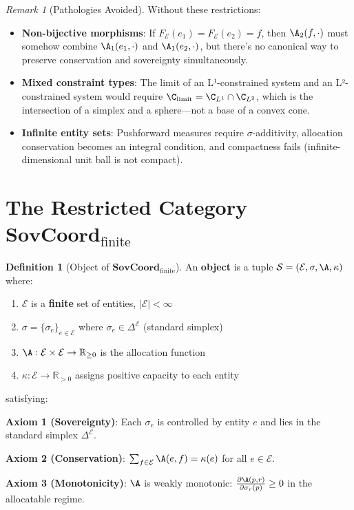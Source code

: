 \documentclass[11pt,a4paper]{article}
\theoremstyle{definition}
\newtheorem{definition}[theorem]{Definition}
\theoremstyle{remark}
\newtheorem{remark}[theorem]{Remark}
\newcommand{\E}{\mathcal{E}}
\newcommand{\SovCoord}{\mathbf{SovCoord}}
\begin{document}
\begin{remark}[Pathologies Avoided]
Without these restrictions:
\begin{itemize}
\item \textbf{Non-bijective morphisms}: If $F_\E(e_1) = F_\E(e_2) = f$, then $\A_2(f, \cdot)$ must somehow combine $\A_1(e_1, \cdot)$ and $\A_1(e_2, \cdot)$, but there's no canonical way to preserve conservation and sovereignty simultaneously.

\item \textbf{Mixed constraint types}: The limit of an L¹-constrained system and an L²-constrained system would require $\C_{\text{limit}} = \C_{L^1} \cap \C_{L^2}$, which is the intersection of a simplex and a sphere—not a base of a convex cone.

\item \textbf{Infinite entity sets}: Pushforward measures require $\sigma$-additivity, allocation conservation becomes an integral condition, and compactness fails (infinite-dimensional unit ball is not compact).
\end{itemize}
\end{remark}

\section{The Restricted Category $\SovCoord_{\text{finite}}$}

\begin{definition}[Object of $\SovCoord_{\text{finite}}$]
An \textbf{object} is a tuple $\mathcal{S} = (\E, \sigma, \A, \kappa)$ where:
\begin{enumerate}
\item $\E$ is a \textbf{finite} set of entities, $|\E| < \infty$
\item $\sigma = \{\sigma_e\}_{e \in \E}$ where $\sigma_e \in \Delta^{\E}$ (standard simplex)
\item $\A: \E \times \E \to \mathbb{R}_{\ge 0}$ is the allocation function
\item $\kappa: \E \to \mathbb{R}_{> 0}$ assigns positive capacity to each entity
\end{enumerate}

satisfying:

\textbf{Axiom 1 (Sovereignty)}: Each $\sigma_e$ is controlled by entity $e$ and lies in the standard simplex $\Delta^{\E}$.

\textbf{Axiom 2 (Conservation)}: $\sum_{f \in \E} \A(e,f) = \kappa(e)$ for all $e \in \E$.

\textbf{Axiom 3 (Monotonicity)}: $\A$ is weakly monotonic: $\frac{\partial \A(p,r)}{\partial \sigma_r(p)} \geq 0$ in the allocatable regime.
\end{definition}
\end{document}
